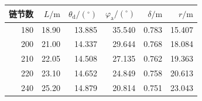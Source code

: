 \begin{tabular}{rrrrrr}
\toprule
链节数 & $L/\mathrm m$ & $\theta_{\mathrm d}/(^\circ)$ & $\varphi_{\mathrm a}/(^\circ)$ & $\delta/\mathrm m$ & $r/\mathrm m$ \\
\midrule
180 & 18.90 & 13.885 & 35.540 & 0.783 & 15.407 \\
200 & 21.00 & 14.337 & 29.644 & 0.768 & 18.084 \\
210 & 22.05 & 14.508 & 27.135 & 0.762 & 19.363 \\
220 & 23.10 & 14.652 & 24.849 & 0.758 & 20.613 \\
240 & 25.20 & 14.879 & 20.814 & 0.751 & 23.043 \\
\bottomrule
\end{tabular}
